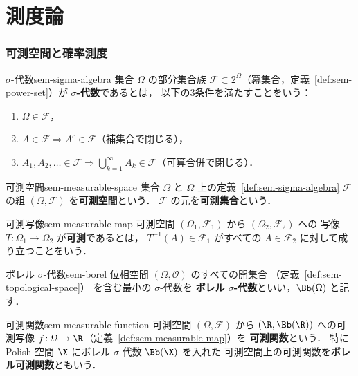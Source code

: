 \chapter{測度論}
\label{ch:found-measure}

\subsection{可測空間と確率測度}
\label{sec:sem-measurable}

\begin{definition}{$\sigma$-代数}{sem-sigma-algebra}
  集合 $\Omega$ の部分集合族 $\mathcal{F} \subset 2^{\Omega}$（冪集合，定義~\ref{def:sem-power-set}）が
  \textbf{$\sigma$-代数}であるとは，
  以下の3条件を満たすことをいう：
  \begin{enumerate}
    \item[(i)] $\Omega \in \mathcal{F}$，
    \item[(ii)] $A \in \mathcal{F} \Longrightarrow A^c \in \mathcal{F}$（補集合で閉じる），
    \item[(iii)] $A_1, A_2, \ldots \in \mathcal{F} \Longrightarrow
      \bigcup_{k=1}^{\infty} A_k \in \mathcal{F}$（可算合併で閉じる）．
  \end{enumerate}
\end{definition}

\begin{definition}{可測空間}{sem-measurable-space}
  集合 $\Omega$ と $\Omega$ 上の定義~\ref{def:sem-sigma-algebra} $\mathcal{F}$ の組
  $(\Omega, \mathcal{F})$ を\textbf{可測空間}という．
  $\mathcal{F}$ の元を\textbf{可測集合}という．
\end{definition}

\begin{definition}{可測写像}{sem-measurable-map}
  可測空間 $(\Omega_1, \mathcal{F}_1)$ から $(\Omega_2, \mathcal{F}_2)$ への
  写像 $T \colon \Omega_1 \to \Omega_2$ が\textbf{可測}であるとは，
  $T^{-1}(A) \in \mathcal{F}_1$ がすべての $A \in \mathcal{F}_2$ に対して成り立つことをいう．
\end{definition}

\begin{definition}{ボレル $\sigma$-代数}{sem-borel}
  位相空間 $(\Omega, \mathcal{O})$ のすべての開集合
  （定義~\ref{def:sem-topological-space}）
  を含む最小の $\sigma$-代数を
  \textbf{ボレル $\sigma$-代数}といい，$\Bb(\Omega)$ と記す．
\end{definition}

\begin{definition}{可測関数}{sem-measurable-function}
  可測空間 $(\Omega, \mathcal{F})$ から $(\R, \Bb(\R))$ への可測写像
  $f \colon \Omega \to \R$（定義~\ref{def:sem-measurable-map}）を
  \textbf{可測関数}という．
  特に Polish 空間 $\X$ にボレル $\sigma$-代数 $\Bb(\X)$ を入れた
  可測空間上の可測関数を\textbf{ボレル可測関数}ともいう．
\end{definition}

